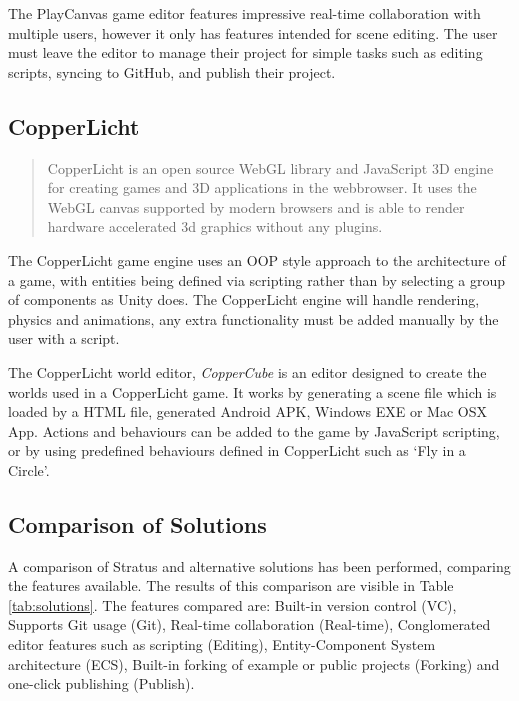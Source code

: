 The PlayCanvas game editor features impressive real-time collaboration with multiple users, however it only has features intended for scene editing. The user must leave the editor to manage their project for simple tasks such as editing scripts, syncing to GitHub, and publish their project.

\subsection{CopperLicht}
\begin{quote}
CopperLicht is an open source WebGL library and JavaScript 3D engine for creating games and 3D applications in the webbrowser. It uses the WebGL canvas supported by modern browsers and is able to render hardware accelerated 3d graphics without any plugins.\cite{copperlicht}
\end{quote}

The CopperLicht game engine uses an OOP style approach to the architecture of a game, with entities being defined via scripting rather than by selecting a group of components as Unity does. The CopperLicht engine will handle rendering, physics and animations, any extra functionality must be added manually by the user with a script.\cite{copperlichtfeatures}

The CopperLicht world editor, \emph{CopperCube} is an editor designed to create the worlds used in a CopperLicht game. It works by generating a scene file which is loaded by a HTML file, generated Android APK, Windows EXE or Mac OSX App.\cite{coppercubefeatures} Actions and behaviours can be added to the game by JavaScript scripting, or by using predefined behaviours defined in CopperLicht such as `Fly in a Circle'.\cite{copperlichtbehaviours}

\subsection{Comparison of Solutions}
A comparison of Stratus and alternative solutions has been performed, comparing the features available. The results of this comparison are visible in Table \ref{tab:solutions}. The features compared are: Built-in version control (VC), Supports Git usage (Git), Real-time collaboration (Real-time), Conglomerated editor features such as scripting (Editing), Entity-Component System architecture (ECS), Built-in forking of example or public projects (Forking) and one-click publishing (Publish).

